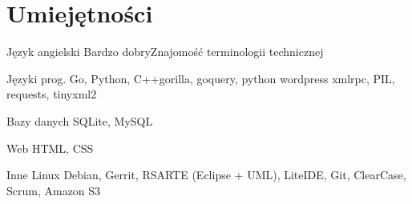 \documentclass[11pt,a4paper,sans,polish]{moderncv}   %
\begin{document}


\section{Umiejętności}

\cvitemwithcomment
	{Język angielski}
	{Bardzo dobry}{Znajomość terminologii technicznej}

\cvitemwithcomment
	{Języki prog.}
	{Go, Python, C++}{gorilla, goquery, python wordpress xmlrpc, PIL, requests, tinyxml2}

\cvitemwithcomment
	{Bazy danych}
	{SQLite, MySQL}{}

\cvitemwithcomment
	{Web}
	{HTML, CSS}{}

\cvitemwithcomment
	{Inne}
	{Linux Debian, Gerrit, RSARTE \small{(Eclipse + UML)}, LiteIDE, Git, ClearCase, Scrum, Amazon S3}{}


\vspace{0.5cm}

\begin{cvcolumns}
\end{cvcolumns}


\thispagestyle{zgoda}
\end{document}
